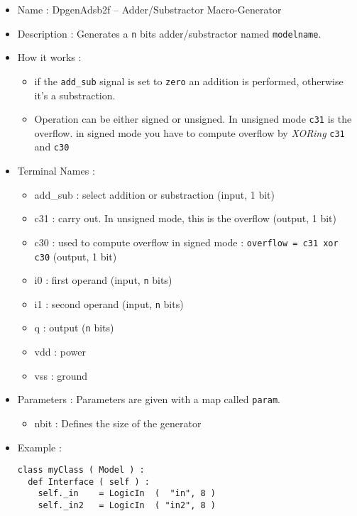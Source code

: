 \begin{itemize}
    \item Name : DpgenAdsb2f -- Adder/Substractor Macro-Generator
    \item Description : Generates a \verb-n- bits adder/substractor named \verb-modelname-.
    \item How it works :
    \begin{itemize}
        \item if the \verb-add_sub- signal is set to \verb-zero- an addition is performed, otherwise it's a substraction.
        \item Operation can be either signed or unsigned. In unsigned mode \verb-c31- is the overflow. in signed mode you have to compute overflow by \emph{XORing} \verb-c31- and \verb-c30-
    \end{itemize}
    \item Terminal Names :
    \begin{itemize}
        \item add\_sub : select addition or substraction (input, 1 bit)
        \item c31 : carry out. In unsigned mode, this is the overflow (output, 1 bit)
        \item c30 : used to compute overflow in signed mode : \verb-overflow = c31 xor c30- (output, 1 bit)
        \item i0 : first operand (input, \verb-n- bits)
        \item i1 : second operand (input, \verb-n- bits)
        \item q : output (\verb-n- bits)
        \item vdd : power
        \item vss : ground
    \end{itemize}
    \item Parameters : Parameters are given with a map called \verb-param-.
    \begin{itemize}
        \item nbit : Defines the size of the generator
    \end{itemize}
    \item Example :
\begin{verbatim}
class myClass ( Model ) :
  def Interface ( self ) :
    self._in    = LogicIn  (  "in", 8 )
    self._in2   = LogicIn  ( "in2", 8 )
    

\end{verbatim}
\end{itemize}
